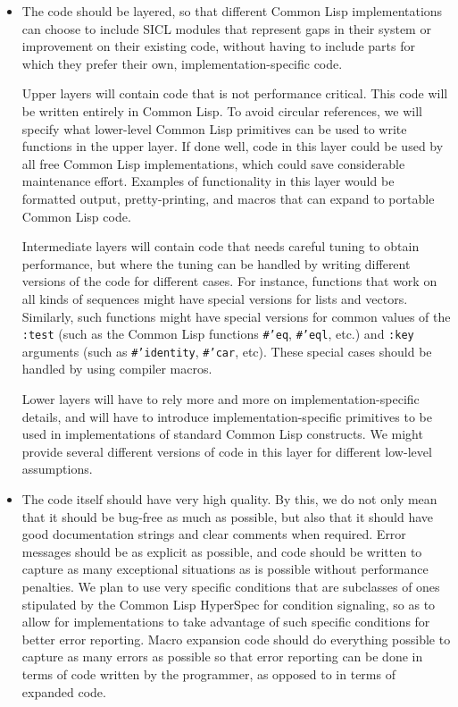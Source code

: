\documentclass{article}
\def\sysname{SICL}
\begin{document}
\begin{itemize}
\item The code should be layered, so that different Common Lisp
  implementations can choose to include \sysname{} modules that
  represent gaps in their system or improvement on their existing
  code, without having to include parts for which they prefer their
  own, implementation-specific code. 

  Upper layers will contain code that is not performance critical.
  This code will be written entirely in Common Lisp.  To avoid
  circular references, we will specify what lower-level Common Lisp
  primitives can be used to write functions in the upper layer.  If
  done well, code in this layer could be used by all free Common Lisp
  implementations, which could save considerable maintenance effort.
  Examples of functionality in this layer would be formatted output,
  pretty-printing, and macros that can expand to portable Common Lisp
  code.

  Intermediate layers will contain code that needs careful tuning to
  obtain performance, but where the tuning can be handled by writing
  different versions of the code for different cases.  For instance,
  functions that work on all kinds of sequences might have special
  versions for lists and vectors.  Similarly, such functions might
  have special versions for common values of the \texttt{:test} (such
  as the Common Lisp functions \texttt{\#'eq}, \texttt{\#'eql}, etc.)
  and \texttt{:key} arguments (such as \texttt{\#'identity},
  \texttt{\#'car}, etc).  These special cases should be handled by
  using compiler macros.

  Lower layers will have to rely more and more on
  implementation-specific details, and will have to introduce
  implementation-specific primitives to be used in implementations of
  standard Common Lisp constructs.  We might provide several different
  versions of code in this layer for different low-level assumptions.

\item The code itself should have very high quality.  By this, we do
  not only mean that it should be bug-free as much as possible, but
  also that it should have good documentation strings and clear
  comments when required.  Error messages should be as explicit as
  possible, and code should be written to capture as many exceptional
  situations as is possible without performance penalties.  We plan to
  use very specific conditions that are subclasses of ones stipulated
  by the Common Lisp HyperSpec for condition signaling, so as to allow
  for implementations to take advantage of such specific conditions
  for better error reporting.  Macro expansion code should do
  everything possible to capture as many errors as possible so that
  error reporting can be done in terms of code written by the
  programmer, as opposed to in terms of expanded code.

\end{itemize}
\end{document}
